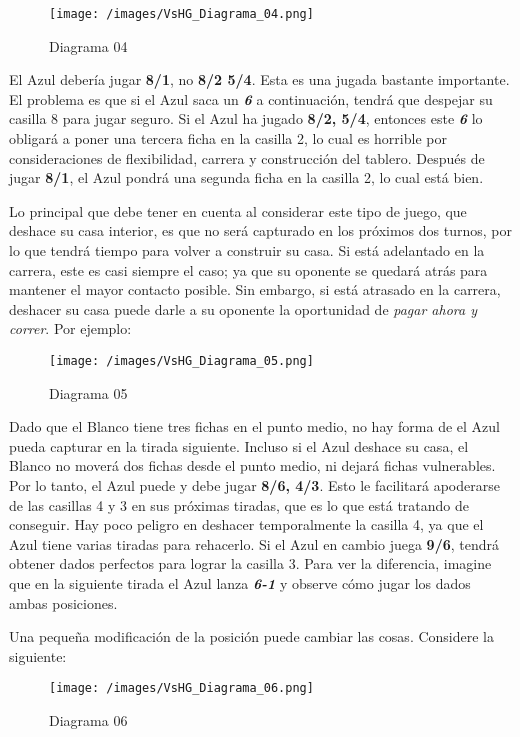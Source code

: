 \documentclass[
]{article}
\begin{document}
\begin{figure}
\centering
\texttt{[image: /images/VsHG\_Diagrama\_04.png]}
\caption{Diagrama 04}
\end{figure}

El Azul debería jugar \textbf{8/1}, no \textbf{8/2 5/4}. Esta es una
jugada bastante importante. El problema es que si el Azul saca un
\textbf{\emph{6}} a continuación, tendrá que despejar su casilla 8 para
jugar seguro. Si el Azul ha jugado \textbf{8/2, 5/4}, entonces este
\textbf{\emph{6}} lo obligará a poner una tercera ficha en la casilla 2,
lo cual es horrible por consideraciones de flexibilidad, carrera y
construcción del tablero. Después de jugar \textbf{8/1}, el Azul pondrá
una segunda ficha en la casilla 2, lo cual está bien.

Lo principal que debe tener en cuenta al considerar este tipo de juego,
que deshace su casa interior, es que no será capturado en los próximos
dos turnos, por lo que tendrá tiempo para volver a construir su casa. Si
está adelantado en la carrera, este es casi siempre el caso; ya que su
oponente se quedará atrás para mantener el mayor contacto posible. Sin
embargo, si está atrasado en la carrera, deshacer su casa puede darle a
su oponente la oportunidad de \emph{pagar ahora y correr}. Por ejemplo:

\begin{figure}
\centering
\texttt{[image: /images/VsHG\_Diagrama\_05.png]}
\caption{Diagrama 05}
\end{figure}

Dado que el Blanco tiene tres fichas en el punto medio, no hay forma de
el Azul pueda capturar en la tirada siguiente. Incluso si el Azul
deshace su casa, el Blanco no moverá dos fichas desde el punto medio, ni
dejará fichas vulnerables. Por lo tanto, el Azul puede y debe jugar
\textbf{8/6, 4/3}. Esto le facilitará apoderarse de las casillas 4 y 3
en sus próximas tiradas, que es lo que está tratando de conseguir. Hay
poco peligro en deshacer temporalmente la casilla 4, ya que el Azul
tiene varias tiradas para rehacerlo. Si el Azul en cambio juega
\textbf{9/6}, tendrá obtener dados perfectos para lograr la casilla 3.
Para ver la diferencia, imagine que en la siguiente tirada el Azul lanza
\textbf{\emph{6-1}} y observe cómo jugar los dados ambas posiciones.

Una pequeña modificación de la posición puede cambiar las cosas.
Considere la siguiente:

\begin{figure}
\centering
\texttt{[image: /images/VsHG\_Diagrama\_06.png]}
\caption{Diagrama 06}
\end{figure}
\end{document}
